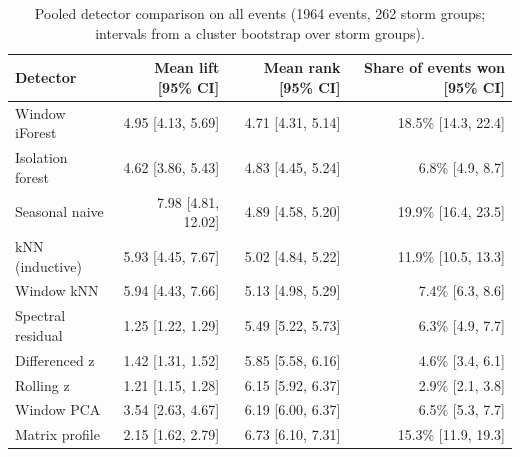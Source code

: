 \begin{table}[t]
\centering
\small
\begin{tabular}{lrrr}
\toprule
Detector & Mean lift [95\% CI] & Mean rank [95\% CI] & Share of events won [95\% CI] \\
\midrule
Window iForest & 4.95 [4.13, 5.69] & 4.71 [4.31, 5.14] & 18.5\% [14.3, 22.4] \\
Isolation forest & 4.62 [3.86, 5.43] & 4.83 [4.45, 5.24] & 6.8\% [4.9, 8.7] \\
Seasonal naive & 7.98 [4.81, 12.02] & 4.89 [4.58, 5.20] & 19.9\% [16.4, 23.5] \\
kNN (inductive) & 5.93 [4.45, 7.67] & 5.02 [4.84, 5.22] & 11.9\% [10.5, 13.3] \\
Window kNN & 5.94 [4.43, 7.66] & 5.13 [4.98, 5.29] & 7.4\% [6.3, 8.6] \\
Spectral residual & 1.25 [1.22, 1.29] & 5.49 [5.22, 5.73] & 6.3\% [4.9, 7.7] \\
Differenced z & 1.42 [1.31, 1.52] & 5.85 [5.58, 6.16] & 4.6\% [3.4, 6.1] \\
Rolling z & 1.21 [1.15, 1.28] & 6.15 [5.92, 6.37] & 2.9\% [2.1, 3.8] \\
Window PCA & 3.54 [2.63, 4.67] & 6.19 [6.00, 6.37] & 6.5\% [5.3, 7.7] \\
Matrix profile & 2.15 [1.62, 2.79] & 6.73 [6.10, 7.31] & 15.3\% [11.9, 19.3] \\
\bottomrule
\end{tabular}
\caption{Pooled detector comparison on all events (1964 events, 262 storm groups; intervals from a cluster bootstrap over storm groups).}
\label{tab:step10-pooled}
\end{table}